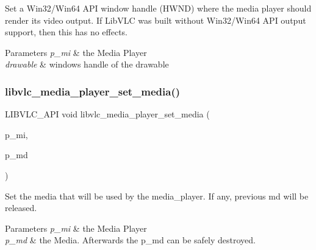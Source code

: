 Set a Win32/\+Win64 A\+PI window handle (H\+W\+ND) where the media player should render its video output. If Lib\+V\+LC was built without Win32/\+Win64 A\+PI output support, then this has no effects.


\begin{DoxyParams}{Parameters}
{\em p\+\_\+mi} & the Media Player \\
\hline
{\em drawable} & windows handle of the drawable \\
\hline
\end{DoxyParams}
\mbox{\label{group__libvlc__media__player_gadeb7ac440f41dbb2aa1a7811904099b1}} 
\subsubsection{\texorpdfstring{libvlc\+\_\+media\+\_\+player\+\_\+set\+\_\+media()}{libvlc\_media\_player\_set\_media()}}
{\footnotesize\ttfamily L\+I\+B\+V\+L\+C\+\_\+\+A\+PI void libvlc\+\_\+media\+\_\+player\+\_\+set\+\_\+media (\begin{DoxyParamCaption}\item[{libvlc\+\_\+media\+\_\+player\+\_\+t $\ast$}]{p\+\_\+mi,  }\item[{libvlc\+\_\+media\+\_\+t $\ast$}]{p\+\_\+md }\end{DoxyParamCaption})}

Set the media that will be used by the media\+\_\+player. If any, previous md will be released.


\begin{DoxyParams}{Parameters}
{\em p\+\_\+mi} & the Media Player \\
\hline
{\em p\+\_\+md} & the Media. Afterwards the p\+\_\+md can be safely destroyed. \\
\hline
\end{DoxyParams}
\mbox{\label{group__libvlc__media__player_ga46c26a395b496e48917101198acc31f6}} 
